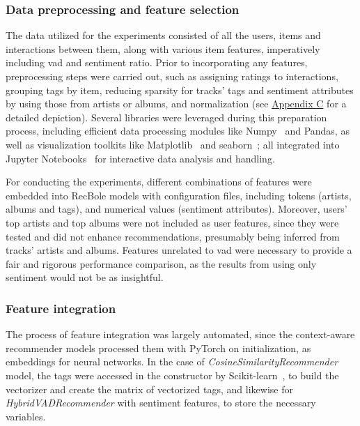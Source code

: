 \subsubsection{Data preprocessing and feature selection}

The data utilized for the experiments consisted of all the users, items and interactions between them, along with various item features, imperatively including \acs{vad} and sentiment ratio. Prior to incorporating any features, preprocessing steps were carried out, such as assigning ratings to interactions, grouping tags by item, reducing sparsity for tracks' tags and sentiment attributes by using those from artists or albums, and normalization (see \hyperref[AP:DATAPROC]{Appendix C} for a detailed depiction). Several libraries were leveraged during this preparation process, including efficient data processing modules like Numpy~\cite{NUMPY} and Pandas, as well as visualization toolkits like Matplotlib~\cite{MATPLOTLIB} and seaborn~\cite{SEABORN}; all integrated into Jupyter Notebooks~\cite{JUPYTER} for interactive data analysis and handling. 

For conducting the experiments, different combinations of features were embedded into RecBole models with configuration files, including tokens (artists, albums and tags), and numerical values (sentiment attributes). Moreover, users' top artists and top albums were not included as user features, since they were tested and did not enhance recommendations, presumably being inferred from tracks' artists and albums. Features unrelated to \acs{vad} were necessary to provide a fair and rigorous performance comparison, as the results from using only sentiment would not be as insightful.

\subsubsection{Feature integration}

The process of feature integration was largely automated, since the context-aware recommender models processed them with PyTorch on initialization, as embeddings for neural networks. In the case of \emph{CosineSimilarityRecommender} model, the tags were accessed in the constructor by Scikit-learn~\cite{SKLEARN}, to build the vectorizer and create the matrix of vectorized tags, and likewise for \emph{HybridVADRecommender} with sentiment features, to store the necessary variables.